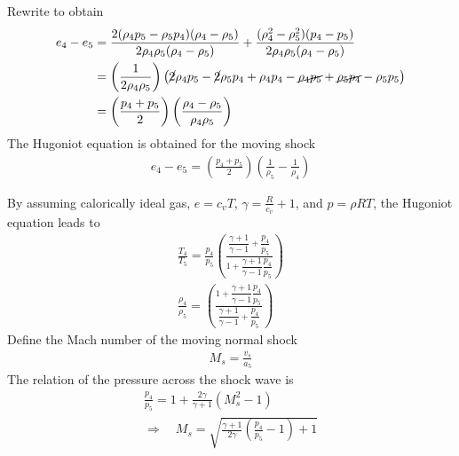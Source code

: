 \documentclass{turgon}
\begin{document}
%
Rewrite to obtain
%
\begin{align*}
  e_4 - e_5 &= \frac{2 (\rho_4 p_5 - \rho_5 p_4) (\rho_4 - \rho_5)}
  {2 \rho_4 \rho_5 (\rho_4 - \rho_5)}
  + \frac{(\rho_4^2 - \rho_5^2) (p_4 - p_5)}
  {2 \rho_4 \rho_5 (\rho_4 - \rho_5)}
  \\
  &= \left(\frac{1}{2 \rho_4 \rho_5}\right)
  \left(
  \cancel{2} \rho_4 p_5 - \cancel{2} \rho_5 p_4
  + \rho_4 p_4 - \cancel{\rho_4 p_5} + \cancel{\rho_5 p_4} - \rho_5 p_5
  \right)
  \\
  &= \left(\frac{p_4 + p_5}{2}\right)
  \left(\frac{\rho_4 - \rho_5}{\rho_4 \rho_5}\right)
\end{align*}
%
The Hugoniot equation is obtained for the moving shock
%
\begin{align}
  e_4 - e_5 = \left(\frac{p_4 + p_5}{2}\right)
  \left(\frac{1}{\rho_5} - \frac{1}{\rho_4}\right)
  \label{e:nshock:hugoniot}
\end{align}

By assuming calorically ideal gas, $e = c_v T$, $\gamma = \frac{R}{c_v} + 1$,
and $p = \rho RT$, the Hugoniot equation leads to
%
\begin{gather}
  \frac{T_4}{T_5} = \frac{p_4}{p_5}
  \left(
  \frac{\dfrac{\gamma + 1}{\gamma - 1} + \dfrac{p_4}{p_5}}
  {1 + \dfrac{\gamma + 1}{\gamma - 1} \dfrac{p_4}{p_5}}
  \right)
  \label{e:nshock:T}
  \\
  \frac{\rho_4}{\rho_5} =
  \left(
  \frac{1 + \dfrac{\gamma + 1}{\gamma - 1} \dfrac{p_4}{p_5}}
  {\dfrac{\gamma + 1}{\gamma - 1} + \dfrac{p_4}{p_5}}
  \right)
  \label{e:nshock:rho}
\end{gather}
%
Define the Mach number of the moving normal shock
%
\begin{gather*}
  M_s = \frac{v_s}{a_5}
\end{gather*}
%
The relation of the pressure across the shock wave is
%
\begin{gather*}
  \frac{p_4}{p_5} = 1 + \frac{2\gamma}{\gamma + 1}(M_s^2 - 1) \\
  \Rightarrow \quad
  M_s = \sqrt{\frac{\gamma + 1}{2\gamma}\left(\frac{p_4}{p_5} - 1\right) + 1}
\end{gather*}
\end{document}
